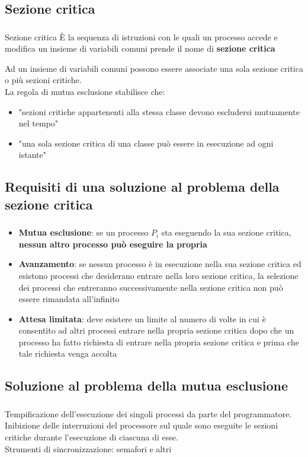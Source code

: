 \documentclass{beamer}
\newenvironment{mainframe}{
	\begin{frame}
		\frametitle{\insertsubsection}
		\framesubtitle{\insertsection}
	}{
	\end{frame}
}
\begin{document}
\subsection{Sezione critica}
\begin{mainframe}
	\begin{block}{Sezione critica}
		È la sequenza di istruzioni con le quali un processo accede e modifica un insieme di variabili comuni prende il nome di \textbf{sezione critica}
	\end{block}
	Ad un insieme di variabili comuni possono essere associate una sola sezione critica o più sezioni critiche.\\
	La regola di mutua esclusione stabilisce che:
	\begin{itemize}
		\item "sezioni critiche appartenenti alla stessa classe devono escludersi mutuamente nel tempo"
		\item "una sola sezione critica di una classe può essere in esecuzione ad ogni istante"
	\end{itemize}
\end{mainframe}
\subsection{Requisiti di una soluzione al problema della sezione critica}
\begin{mainframe}
	\begin{itemize}
		\item \textbf{Mutua esclusione}: se un processo $P_i$ sta eseguendo la sua sezione critica, \textbf{nessun altro processo può eseguire la propria}
		\item \textbf{Avanzamento}: se nessun processo è in esecuzione nella sua sezione critica ed esistono processi che desiderano entrare nella loro sezione critica, la selezione dei processi che entreranno successivamente nella sezione critica non può essere rimandata all'infinito
		\item \textbf{Attesa limitata}: deve esistere un limite al numero di volte in cui è consentito ad altri processi entrare nella propria sezione critica dopo che un processo ha fatto richiesta di entrare nella propria sezione critica e prima che tale richiesta venga accolta
	\end{itemize}
\end{mainframe}
\subsection{Soluzione al problema della mutua esclusione}
\begin{mainframe}
	Tempificazione dell'esecuzione dei singoli processi da parte del programmatore.\\
	Inibizione delle interruzioni del processore sul quale sono eseguite le sezioni critiche durante l'esecuzione di ciascuna di esse.\\
	Strumenti di sincronizzazione: semafori e altri
\end{mainframe}
\end{document}
